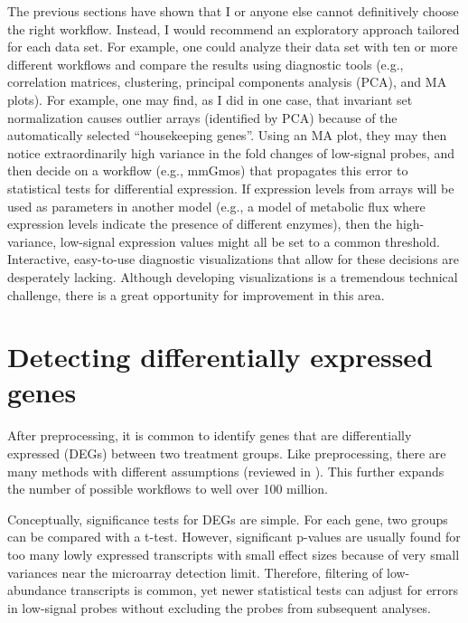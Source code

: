 The previous sections have shown that I or anyone
else cannot definitively choose the right workflow. 
Instead, I would recommend an exploratory approach 
tailored for each data set.
For example, one could analyze their data set with ten 
or more different workflows and compare the results
using diagnostic tools (e.g., correlation matrices, clustering,
principal components analysis (PCA), and MA plots).
For example, one may find, as I did in one case, that invariant set
normalization causes outlier arrays (identified by PCA) because
of the automatically selected ``housekeeping genes''.
Using an MA plot, they may then notice extraordinarily
high variance in the fold changes of low-signal probes, and then decide
on a workflow (e.g., mmGmos) that propagates this error to
statistical tests for differential expression. If expression levels
from arrays will be used as parameters in another model (e.g., a model
of metabolic flux where expression levels indicate the presence of 
different enzymes), then the high-variance, low-signal expression values
might all be set to a common threshold.
Interactive, easy-to-use diagnostic visualizations that allow for these
decisions are desperately lacking.
Although developing visualizations is a tremendous technical challenge,
there is a great opportunity for improvement in this area.

\section[Differential expression]{Detecting differentially expressed genes}

After preprocessing, it is common to identify genes that are differentially
expressed (DEGs) between two treatment groups. Like preprocessing,
there are many methods with different assumptions (reviewed in
\cite{Cui:2003vl,Murie:2009dk,Storey:2003kd,Sreekumar:2008wj,
Pan:2002hy,Hong:2008hy,Yanofsky:2010by,Kadota:2011dz,Jeffery:2006bm}). This further expands
the number of possible workflows to well over 100 million.

Conceptually, significance tests for DEGs are simple.
For each gene, two groups can be compared with a t-test.
However, significant p-values are usually found for too many 
lowly expressed transcripts with small effect sizes because of very small
variances near the microarray detection limit.
Therefore, filtering of low-abundance transcripts is common, 
yet newer statistical tests can adjust for errors in low-signal probes
without excluding the probes from subsequent analyses.

